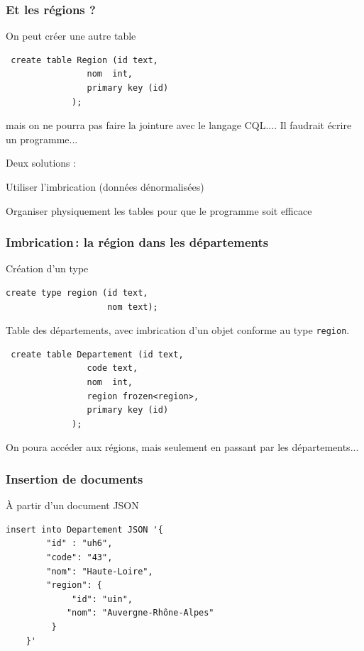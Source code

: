 \begin{frame}[fragile]
\frametitle{Et les régions ?}

\vfill

On peut créer une autre table 

\begin{verbatim}
 create table Region (id text, 
                nom  int, 
                primary key (id) 
             );
\end{verbatim}

\vfil

\alert{mais on ne pourra pas faire la jointure avec le langage CQL...}. Il
faudrait écrire un programme...

\vfill

Deux solutions :
\begin{redbullet}
  \item Utiliser l'imbrication (données dénormalisées)
  \item Organiser physiquement les tables pour que le programme soit efficace
\end{redbullet}
\end{frame}


\begin{frame}[fragile]
\frametitle{Imbrication\,: la région dans les départements}

Création d'un type
\begin{verbatim}
create type region (id text,
                    nom text);
\end{verbatim}

\vfill

Table des départements, avec imbrication d'un objet conforme au type \texttt{region}.


\begin{verbatim}
 create table Departement (id text, 
                code text, 
                nom  int, 
                region frozen<region>,
                primary key (id) 
             );
\end{verbatim}

\vfill

On poura accéder aux régions, mais seulement en passant par les départements...
\end{frame}

\begin{frame}[fragile]
\frametitle{Insertion de documents}

À partir d'un document JSON

\begin{verbatim}
insert into Departement JSON '{
		"id" : "uh6",
		"code": "43",
		"nom": "Haute-Loire",
		"region": {
		     "id": "uin", 
		    "nom": "Auvergne-Rhône-Alpes"
		 }
	}' 
\end{verbatim}

\end{frame}


